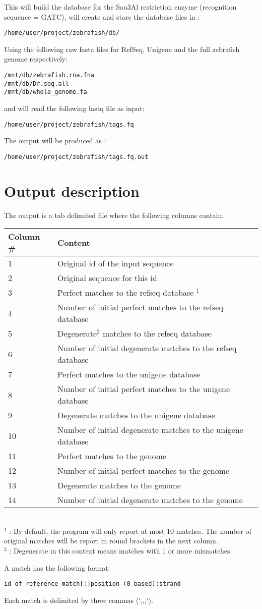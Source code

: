 \documentclass[a4paper,12pt]{article}
\begin{document}
This will build the database for the Sau3Al restriction enzyme (recognition sequence = GATC), will create and store the database files in :
\begin{verbatim}
/home/user/project/zebrafish/db/ 
\end{verbatim}
Using the following raw fasta files for RefSeq, Unigene and the full zebrafish genome respectively:

\begin{verbatim}
/mnt/db/zebrafish.rna.fna
/mnt/db/Dr.seq.all 
/mnt/db/whole_genome.fa
\end{verbatim}
and will read the following fastq file as input:
\begin{verbatim}
/home/user/project/zebrafish/tags.fq
\end{verbatim}
The output will be produced as :
\begin{verbatim}
/home/user/project/zebrafish/tags.fq.out
\end{verbatim}

 



\section{Output description}
\label{sec:outformat}

The output is a tab delimited file where the following columns contain: \\
\begin{tabular}{ll}
\hline
Column \# & Content \\
\hline
1 & Original id of the input sequence \\
2 & Original sequence for this id \\
3 & Perfect matches to the refseq database $^1$ \\
4 & Number of initial perfect matches to the refseq database \\
5 & Degenerate$^2$ matches to the refseq database  \\
6 & Number of initial degenerate matches to the refseq database \\
7 & Perfect matches to the unigene database  \\
8 & Number of initial perfect matches to the unigene database \\
9 & Degenerate matches to the unigene database  \\
10 & Number of initial degenerate matches to the unigene database \\
11 & Perfect matches to the genome  \\
12 & Number of initial perfect matches to the genome \\
13 & Degenerate matches to the genome  \\
14 & Number of initial degenerate matches to the genome \\
\hline
\end{tabular}
\\
$^1$ : By default, the program will only report at most 10 matches. The number of original matches will be report in round brackets in the next column. \\
$^2$ : Degenerate in this context means matches with 1 or more mismatches.

A match has the following format: 
\begin{verbatim}
id of reference match[:]position (0-based):strand
\end{verbatim}

Each match is delimited by three commas (`,,,`). 
\end{document}

